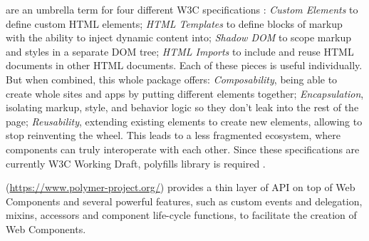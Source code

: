 \begin{description}
\itemsep1pt\parskip0pt

\item[Web Components] are an umbrella term for four different W3C specifications \cite{w3c}:
\emph{Custom Elements} to define custom HTML elements;
\emph{HTML Templates} to define blocks of markup with the ability to inject dynamic content into;
\emph{Shadow DOM} to scope markup and styles in a separate DOM tree;
\emph{HTML Imports} to include and reuse HTML documents in other HTML documents.
Each of these pieces is useful individually. But when combined, this whole package offers:
\emph{Composability}, being able to create whole sites and apps by putting different elements together;
\emph{Encapsulation}, isolating markup, style, and behavior logic so they don't leak into the rest of the page;
\emph{Reusability}, extending existing elements to create new elements, allowing to stop reinventing the wheel.
This leads to a less fragmented ecosystem, where components can truly interoperate with each other.
Since these specifications are currently W3C Working Draft, polyfills library is required \cite{webcomponents-polyfills}.
        
\item[Polymer library] (\url{https://www.polymer-project.org/}) provides a thin layer of API on top of Web Components and several powerful features, such as custom events and delegation, mixins, accessors and component life-cycle functions, to facilitate the creation of Web Components. 
\end{description}


 
